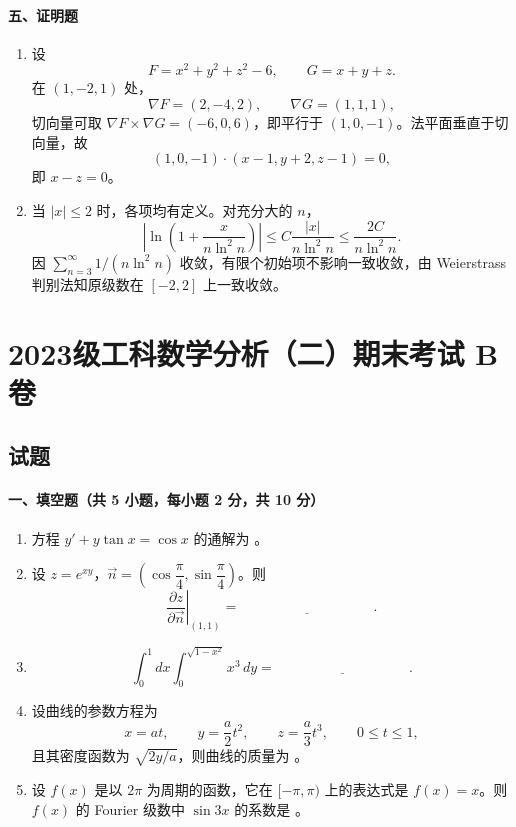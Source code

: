 \paragraph*{五、证明题}
\begin{enumerate}
  \item 设
  \[
    F=x^2+y^2+z^2-6,\qquad G=x+y+z.
  \]
  在 $(1,-2,1)$ 处，
  \[
    \nabla F=(2,-4,2),\qquad \nabla G=(1,1,1),
  \]
  切向量可取 $\nabla F\times\nabla G=(-6,0,6)$，即平行于 $(1,0,-1)$。法平面垂直于切向量，故
  \[
    (1,0,-1)\cdot(x-1,y+2,z-1)=0,
  \]
  即 $x-z=0$。
  \item 当 $|x|\le2$ 时，各项均有定义。对充分大的 $n$，
  \[
    \left|\ln\left(1+\frac{x}{n\ln^2n}\right)\right|
    \le C\frac{|x|}{n\ln^2n}
    \le \frac{2C}{n\ln^2n}.
  \]
  因 $\sum_{n=3}^\infty 1/(n\ln^2n)$ 收敛，有限个初始项不影响一致收敛，由 Weierstrass 判别法知原级数在 $[-2,2]$ 上一致收敛。
\end{enumerate}

\section{2023级工科数学分析（二）期末考试 B 卷}

\subsection{试题}

\paragraph*{一、填空题（共 5 小题，每小题 2 分，共 10 分）}
\begin{enumerate}
  \item 方程 $y'+y\tan x=\cos x$ 的通解为 \underline{\hspace{4cm}}。
  \item 设 $z=e^{xy}$，$\vec n=\left(\cos\dfrac{\pi}{4},\sin\dfrac{\pi}{4}\right)$。则
  \[
    \left.\frac{\partial z}{\partial \vec n}\right|_{(1,1)}=\underline{\hspace{4cm}}.
  \]
  \item
  \[
    \int_0^1 dx\int_0^{\sqrt{1-x^2}}x^3\,dy=\underline{\hspace{4cm}}.
  \]
  \item 设曲线的参数方程为
  \[
    x=at,\qquad y=\frac a2t^2,\qquad z=\frac a3t^3,\qquad 0\le t\le 1,
  \]
  且其密度函数为 $\sqrt{2y/a}$，则曲线的质量为 \underline{\hspace{4cm}}。
  \item 设 $f(x)$ 是以 $2\pi$ 为周期的函数，它在 $[-\pi,\pi)$ 上的表达式是 $f(x)=x$。则 $f(x)$ 的 Fourier 级数中 $\sin 3x$ 的系数是 \underline{\hspace{4cm}}。
\end{enumerate}


